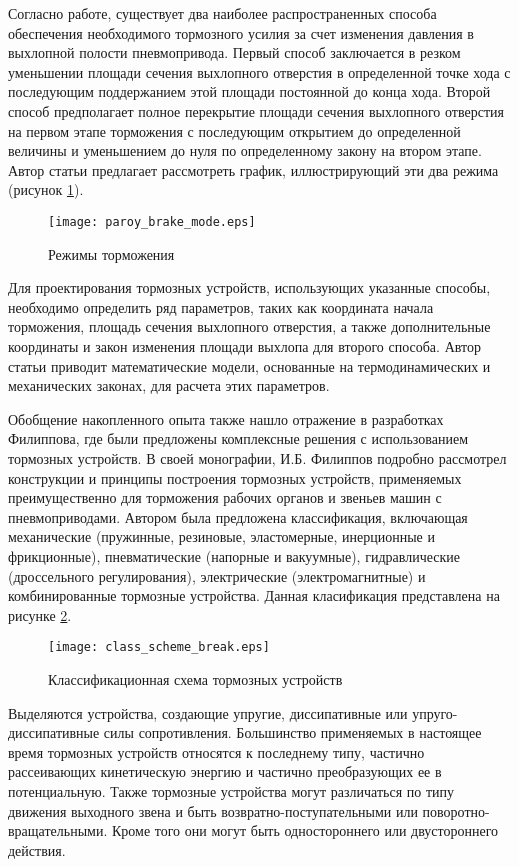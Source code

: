 Согласно работе, существует два наиболее распространенных способа обеспечения необходимого
тормозного усилия за счет изменения давления в выхлопной полости пневмопривода. Первый способ заключается в
резком уменьшении площади сечения выхлопного отверстия в определенной точке хода с
последующим поддержанием этой площади постоянной до конца хода. Второй способ предполагает
полное перекрытие площади сечения выхлопного отверстия на первом этапе торможения с последующим
открытием до определенной величины и уменьшением до нуля по определенному закону на втором этапе.
Автор статьи предлагает рассмотреть график, иллюстрирующий эти два режима (рисунок \cref*{fig:парой_режимы_торможения}).

\begin{figure}[h]
	\centerfloat
	\texttt{[image: paroy\_brake\_mode.eps]}
	\caption{Режимы торможения}\label{fig:парой_режимы_торможения}
\end{figure}

Для проектирования тормозных устройств, использующих указанные способы, необходимо определить ряд
параметров, таких как координата начала торможения, площадь сечения выхлопного отверстия,
а также дополнительные координаты и закон изменения площади выхлопа для второго способа.
Автор статьи приводит математические модели, основанные на термодинамических и механических законах,
для расчета этих параметров.

Обобщение накопленного опыта также нашло отражение в разработках Филиппова, где были предложены комплексные решения с использованием
тормозных устройств. В своей монографии, И.Б. Филиппов \cite*{филипов:тормозные_устройства} подробно рассмотрел конструкции и
принципы построения тормозных устройств, применяемых преимущественно для торможения рабочих органов и звеньев машин
с пневмоприводами. Автором была предложена классификация, включающая механические (пружинные, резиновые, эластомерные, инерционные и фрикционные),
пневматические (напорные и вакуумные), гидравлические (дроссельного регулирования), электрические (электромагнитные) и комбинированные тормозные устройства.
Данная класификация представлена на рисунке \cref*{fig:класс_схема_тормозных_устройств}.


\begin{figure}[h]
	\centerfloat
	\texttt{[image: class\_scheme\_break.eps]}
	\caption{Классификационная схема тормозных устройств}
	\label{fig:класс_схема_тормозных_устройств}
\end{figure}

Выделяются устройства, создающие упругие,
диссипативные или упруго-диссипативные силы сопротивления. Большинство применяемых в настоящее
время тормозных устройств относятся к последнему типу, частично рассеивающих кинетическую энергию и
частично преобразующих ее в потенциальную. Также тормозные устройства могут различаться
по типу движения выходного звена и быть возвратно-поступательными или поворотно-вращательными. Кроме
того они могут быть одностороннего или двустороннего действия. 


